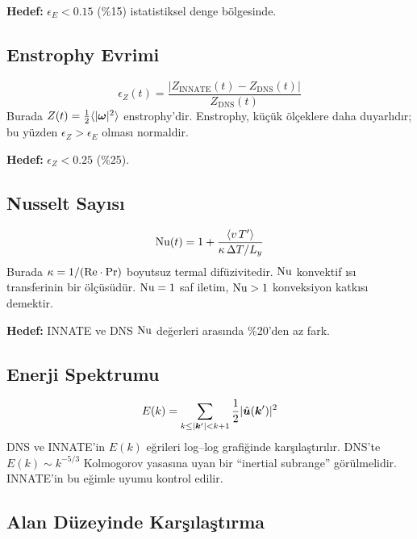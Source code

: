 \textbf{Hedef:} $\epsilon_E < 0.15$ (\%15) istatistiksel denge bölgesinde.

\subsection{Enstrophy Evrimi}

\begin{equation}
    \epsilon_Z(t) = \frac{|Z_{\text{INNATE}}(t) - Z_{\text{DNS}}(t)|}{Z_{\text{DNS}}(t)}
    \label{eq:enstrophy_error}
\end{equation}
Burada $Z(t) = \frac{1}{2} \langle |\bm{\omega}|^2 \rangle$ enstrophy'dir. Enstrophy, küçük ölçeklere daha duyarlıdır; bu yüzden $\epsilon_Z > \epsilon_E$ olması normaldir.

\textbf{Hedef:} $\epsilon_Z < 0.25$ (\%25).

\subsection{Nusselt Sayısı}

\begin{equation}
    \mathrm{Nu}(t) = 1 + \frac{\langle v \, T' \rangle}{\kappa \, \Delta T / L_y}
    \label{eq:nusselt_dns}
\end{equation}
Burada $\kappa = 1/(\mathrm{Re} \cdot \mathrm{Pr})$ boyutsuz termal difüzivitedir. $\mathrm{Nu}$ konvektif ısı transferinin bir ölçüsüdür. $\mathrm{Nu} = 1$ saf iletim, $\mathrm{Nu} > 1$ konveksiyon katkısı demektir.

\textbf{Hedef:} INNATE ve DNS $\mathrm{Nu}$ değerleri arasında \%20'den az fark.

\subsection{Enerji Spektrumu}

\begin{equation}
    E(k) = \sum_{k \leq |\bm{k}'| < k+1} \frac{1}{2} |\hat{\bm{u}}(\bm{k}')|^2
    \label{eq:energy_spectrum}
\end{equation}
DNS ve INNATE'in $E(k)$ eğrileri log--log grafiğinde karşılaştırılır. DNS'te $E(k) \sim k^{-5/3}$ Kolmogorov yasasına uyan bir ``inertial subrange'' görülmelidir. INNATE'in bu eğimle uyumu kontrol edilir.

\subsection{Alan Düzeyinde Karşılaştırma}

